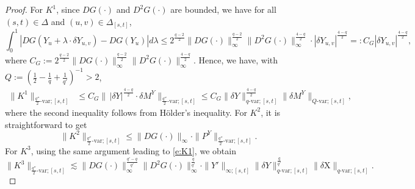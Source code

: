 \documentclass[11pt,reqno]{amsart}
\numberwithin{equation}{section}
\begin{document}
\begin{proof}
For $K^{1}$, since $DG(\bm\cdot)$ and $D^2 G(\bm\cdot)$ are bounded, we have for all $(s,t) \in \Delta$ and $(u,v) \in \Delta_{[s,t]}$, 
\begin{equation*}
\int_{0}^{1}|DG(Y_{u} + \lambda\cdot \delta Y_{u,v}) - DG(Y_{u})| d\lambda \le 2^{\frac{q-2}{2}} \|DG(\bm\cdot)\|^{\frac{q-2}{2}}_{\infty} \|D^2 G(\bm\cdot)\|^{\frac{4-q}{2}}_{\infty} \cdot |\delta Y_{u,v}|^{\frac{4-q}{2}} =: C_G |\delta Y_{u,v}|^{\frac{4-q}{2}},
\end{equation*}
where $C_G := 2^{\frac{q-2}{2}} \|DG(\bm\cdot)\|^{\frac{q-2}{2}}_{\infty} \|D^2G(\bm\cdot)\|^{\frac{4-q}{2}}_{\infty}$. 
Hence, we have, with $Q := (\frac{1}{2} - \frac{1}{q} + \frac{1}{q'})^{-1} > 2$,  
\begin{equation}\label{e:K1}
\begin{aligned}
\|K^1\|_{\frac{q''}{2}\text{-var};[s,t]}&\le C_G \| \, |\delta Y|^{\frac{4 - q}{2}} \cdot \delta M^{Y} \|_{\frac{q''}{2}\text{-}\mathrm{var};[s,t]}  \le C_G \|\delta Y\|^{\frac{4-q}{2}}_{q\text{-var};[s,t]} \|\delta M^Y\|_{Q\text{-var};[s,t]},
\end{aligned}
\end{equation}
where the second inequality follows from  H\"older's inequality. For $K^2$, it is straightforward  to get 
\begin{equation*}
\|K^{2} \|_{\frac{q''}{2}\text{-var};[s,t]} \le  \|DG(\bm\cdot)\|_\infty \cdot \|P^Y\|_{\frac{q''}{2}\text{-var};[s,t]}.
\end{equation*}
For $K^3$, using the same argument leading to  \eqref{e:K1}, we obtain 
\begin{equation}\label{e:K3}
\| K^{3}\|_{\frac{q''}{2}\text{-var};[s,t]}\lesssim  \|DG(\bm\cdot)\|^{\frac{q'-q}{q'}}_\infty \|D^2 G(\bm\cdot)\|^{\frac{q}{q'}}_\infty \cdot \|Y'\|_{\infty;[s,t]} \|\delta Y\|^{\frac{q}{q'}}_{q\text{-var};[s,t]} \|\delta \mathrm X\|_{q\text{-var};[s,t]}.
\end{equation}


\end{proof}
\end{document}
